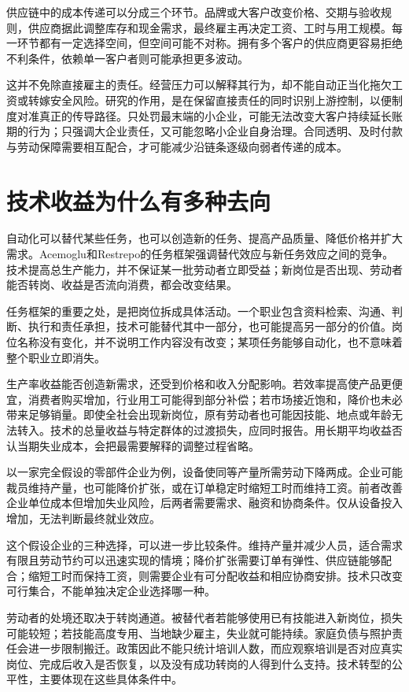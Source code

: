 \documentclass[UTF8,fontset=fandol,zihao=-4,oneside,openany]{ctexbook}
\begin{document}
\label{arg:P068}
供应链中的成本传递可以分成三个环节。品牌或大客户改变价格、交期与验收规则，供应商据此调整库存和现金需求，最终雇主再决定工资、工时与用工规模。每一环节都有一定选择空间，但空间可能不对称。拥有多个客户的供应商更容易拒绝不利条件，依赖单一客户者则可能承担更多波动。

这并不免除直接雇主的责任。经营压力可以解释其行为，却不能自动正当化拖欠工资或转嫁安全风险。研究的作用，是在保留直接责任的同时识别上游控制，以便制度对准真正的传导路径。只处罚最末端的小企业，可能无法改变大客户持续延长账期的行为；只强调大企业责任，又可能忽略小企业自身治理。合同透明、及时付款与劳动保障需要相互配合，才可能减少沿链条逐级向弱者传递的成本。

\section{技术收益为什么有多种去向}
自动化可以替代某些任务，也可以创造新的任务、提高产品质量、降低价格并扩大需求。Acemoglu和Restrepo的任务框架强调替代效应与新任务效应之间的竞争。技术提高总生产能力，并不保证某一批劳动者立即受益；新岗位是否出现、劳动者能否转岗、收益是否流向消费，都会改变结果。\cite{Acemoglu2019}

\label{arg:P069}
任务框架的重要之处，是把岗位拆成具体活动。一个职业包含资料检索、沟通、判断、执行和责任承担，技术可能替代其中一部分，也可能提高另一部分的价值。岗位名称没有变化，并不说明工作内容没有改变；某项任务能够自动化，也不意味着整个职业立即消失。

生产率收益能否创造新需求，还受到价格和收入分配影响。若效率提高使产品更便宜，消费者购买增加，行业用工可能得到部分补偿；若市场接近饱和，降价也未必带来足够销量。即使全社会出现新岗位，原有劳动者也可能因技能、地点或年龄无法转入。技术的总量收益与特定群体的过渡损失，应同时报告。用长期平均收益否认当期失业成本，会把最需要解释的调整过程省略。

以一家完全假设的零部件企业为例，设备使同等产量所需劳动下降两成。企业可能裁员维持产量，也可能降价扩张，或在订单稳定时缩短工时而维持工资。前者改善企业单位成本但增加失业风险，后两者需要需求、融资和协商条件。仅从设备投入增加，无法判断最终就业效应。

\label{arg:P070}
这个假设企业的三种选择，可以进一步比较条件。维持产量并减少人员，适合需求有限且劳动节约可以迅速实现的情境；降价扩张需要订单有弹性、供应链能够配合；缩短工时而保持工资，则需要企业有可分配收益和相应协商安排。技术只改变可行集合，不能单独决定企业选择哪一种。

劳动者的处境还取决于转岗通道。被替代者若能够使用已有技能进入新岗位，损失可能较短；若技能高度专用、当地缺少雇主，失业就可能持续。家庭负债与照护责任会进一步限制搬迁。政策因此不能只统计培训人数，而应观察培训是否对应真实岗位、完成后收入是否恢复，以及没有成功转岗的人得到什么支持。技术转型的公平性，主要体现在这些具体条件中。
\end{document}
